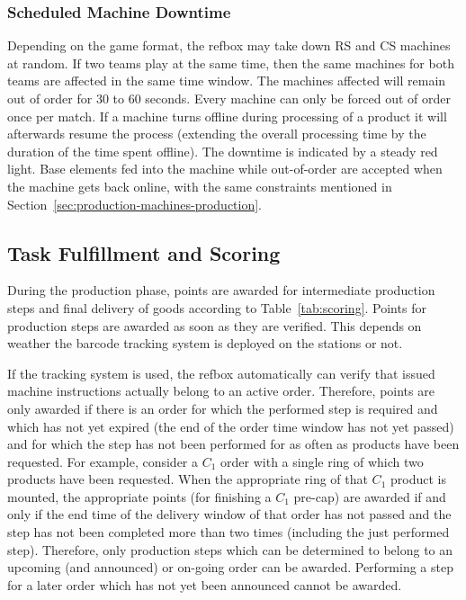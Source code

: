 \documentclass[12pt,twoside]{article}
\newcommand{\refsec}[1]{Section~\ref{#1}}
\newcommand{\reftab}[1]{Table~\ref{#1}}
\begin{document}
\subsubsection{Scheduled Machine Downtime}
\label{sec:out-of-order}
Depending on the game format, the \ac{refbox} may take down \ac{RS} and \ac{CS}
machines at random. If two teams play at the same time, then the same machines
for both teams are affected in the same time window.
The machines affected will remain out of order for 30 to 60
seconds. Every machine can only be forced out of order once per
match. If a machine turns offline during processing of a product it will
afterwards resume the process (extending the overall processing time
by the duration of the time spent offline). The downtime is indicated by a
steady red light.
Base elements fed into the machine while out-of-order are
accepted when the machine gets back online, with the same constraints
mentioned in \refsec{sec:production-machines-production}.



\subsection{Task Fulfillment and Scoring}
\label{sec:production-scoring}
During the production phase, points are awarded for intermediate
production steps and final delivery of goods according to
\reftab{tab:scoring}.
Points for production steps are awarded as soon as they are verified.
This depends on weather the barcode tracking system is deployed on the
stations or not.

If the tracking system is used, the \ac{refbox} automatically can verify that
issued machine instructions actually belong to an active order.
Therefore, points are only awarded if there is an order for which the
performed step is required and which has not yet expired (the end of
the order time window has not yet passed) and for which the step has
not been performed for as often as products have been requested. For
example, consider a $C_1$ order with a single ring of which two
products have been requested. When the appropriate ring of that $C_1$
product is mounted, the appropriate points (for finishing a $C_1$
pre-cap) are awarded if and only if the end time of the delivery
window of that order has not passed and the step has not been
completed more than two times (including the just performed
step). Therefore, only production steps which can be determined to
belong to an upcoming (and announced) or on-going order can be
awarded. Performing a step for a later order which has not yet been
announced cannot be awarded.
\end{document}

